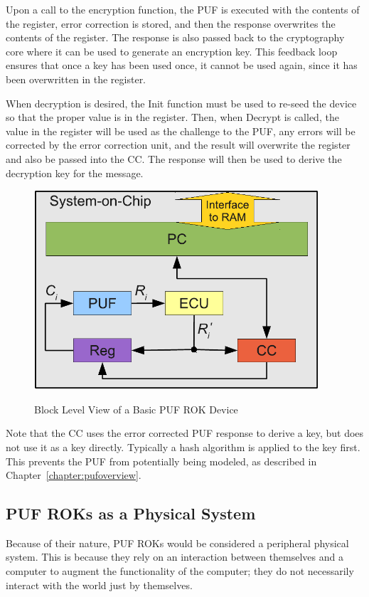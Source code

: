 Upon a call to the encryption function, the PUF is executed with the contents of the register, error correction is stored,
and then the response overwrites the contents of the register. The response is also passed back to the cryptography
core where it can be used to generate an encryption key. This feedback loop ensures that once a key has been used
once, it cannot be used again, since it has been overwritten in the register.

When decryption is desired, the Init function must be used to re-seed the device so that the proper value is in the
register. Then, when Decrypt is called, the value in the register will be used as the challenge to the PUF, any errors
will be corrected by the error correction unit, and the result will overwrite the register and also be passed into the
CC. The response will then be used to derive the decryption key for the message.

\begin{figure}[!ht]
\includegraphics[width=400px]{images/rok_soc.pdf}
\label{fig:basicrok}
\caption{Block Level View of a Basic PUF ROK Device}
\end{figure}
\FloatBarrier

Note that the CC uses the error corrected PUF response to derive a key, but does not use it as a key directly.	Typically
a hash algorithm is applied to the key first. This prevents the PUF from potentially being modeled, as described in
Chapter~\ref{chapter:pufoverview}.

\subsection{PUF ROKs as a Physical System}
Because of their nature, PUF ROKs would be considered a peripheral physical system. This is because they rely
on an interaction between themselves and a computer to augment the functionality of the computer; 
they do not necessarily interact with the world just by themselves.

